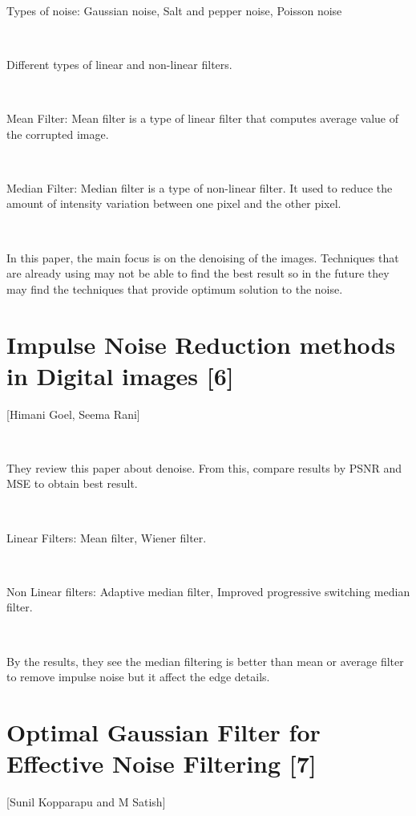 \

Types of noise: Gaussian noise, Salt and pepper noise, Poisson noise

\

Different types of linear and non-linear filters.

\

Mean Filter: Mean filter is a type of linear filter that computes average value of the corrupted image.

\

Median Filter: Median filter is a type of non-linear filter. It used to reduce the amount of intensity variation between one pixel and the other pixel.

\

In this paper, the main focus is on the denoising of the images. Techniques that are already using may not be able to find the best result so in the future they may find the techniques that provide optimum solution to the noise.
\vspace{1.5cm}

\section{Impulse Noise Reduction
methods in Digital images [6]}
[Himani Goel, Seema Rani]

\

They review this paper about denoise. From this, compare results by PSNR and MSE to obtain best result. 

\

Linear Filters: Mean filter, Wiener filter.

\

Non Linear filters: Adaptive median
filter, Improved progressive
switching median
filter.

\


By the results, they see the median filtering is better than mean or average filter to remove impulse noise but it affect the edge details.
\vspace{1.5cm}

\section{Optimal Gaussian Filter for Effective Noise Filtering [7]}
[Sunil Kopparapu and M Satish]
\vspace{0.5cm}

